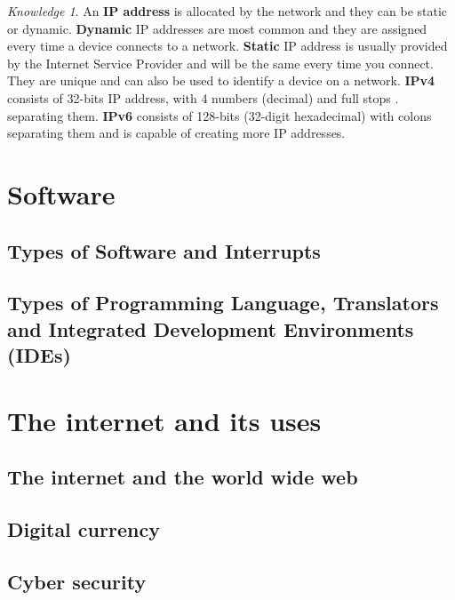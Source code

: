 \documentclass[8pt]{article}
\theoremstyle{remark}
\newtheorem{knowledge}[method]{Knowledge}
\begin{document}
            \begin{knowledge}
                An \textbf{IP address} is allocated by the network and they can be static or dynamic. \textbf{Dynamic} IP addresses are most common and they are assigned every time a device connects to a network. \textbf{Static} IP address is usually provided by the Internet Service Provider and will be the same every time you connect. They are unique and can also be used to identify a device on a network. \textbf{IPv4} consists of 32-bits IP address, with 4 numbers (decimal) and full stops . separating them. \textbf{IPv6} consists of 128-bits (32-digit hexadecimal) with colons separating them and is capable of creating more IP addresses.
            \end{knowledge}
    
    \section{Software}

        \subsection{Types of Software and Interrupts}

        \subsection{Types of Programming Language, Translators and Integrated Development Environments (IDEs)}

    \section{The internet and its uses}
        
        \subsection{The internet and the world wide web}

        \subsection{Digital currency}

        \subsection{Cyber security}
\end{document}
